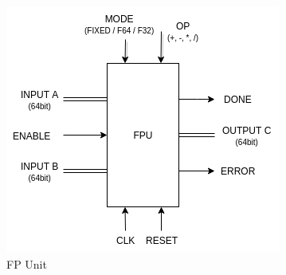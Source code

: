 \documentclass[12pt]{report}
\begin{document}
\begin{center}
    \begin{figure}[hp]
        \centering
        \includegraphics[width=\textwidth]{FPU}
        \caption{FP Unit}
        \label{fig:fpu}
    \end{figure}
\end{center}
\end{document}
